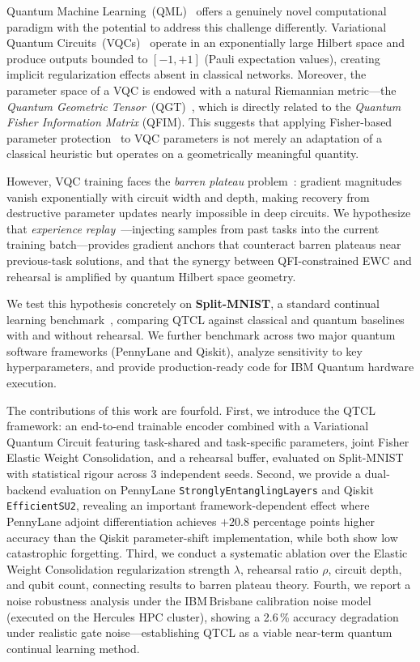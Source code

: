 \documentclass[a4paper,nopdfoutputerror]{quantumarticle}
\begin{document}
Quantum Machine Learning~(QML)~\cite{biamonte2017,schuld2019} offers a
genuinely novel computational paradigm with the potential to address this
challenge differently.
Variational Quantum Circuits~(VQCs)~\cite{cerezo2021variational} operate in
an exponentially large Hilbert space and produce outputs bounded to $[-1,+1]$
(Pauli expectation values), creating implicit regularization effects absent in
classical networks.
Moreover, the parameter space of a VQC is endowed with a natural Riemannian
metric---the \emph{Quantum Geometric Tensor}~(QGT)~\cite{haug2021}, which is
directly related to the \emph{Quantum Fisher Information Matrix} (QFIM).
This suggests that applying Fisher-based parameter protection~\cite{kirkpatrick2017overcoming}
to VQC parameters is not merely an adaptation of a classical heuristic but
operates on a geometrically meaningful quantity.

However, VQC training faces the \emph{barren plateau}
problem~\cite{mcclean2018barren}: gradient magnitudes vanish exponentially
with circuit width and depth, making recovery from destructive parameter
updates nearly impossible in deep circuits.
We hypothesize that \emph{experience replay}~\cite{Rebuffi2017}---injecting
samples from past tasks into the current training batch---provides gradient
anchors that counteract barren plateaus near previous-task solutions, and
that the synergy between QFI-constrained EWC and rehearsal is amplified by
quantum Hilbert space geometry.

We test this hypothesis concretely on \textbf{Split-MNIST}, a standard continual
learning benchmark~\cite{zenke2017continual,lecun1998}, comparing
QTCL against classical and quantum baselines with and without rehearsal.
We further benchmark across two major quantum software frameworks (PennyLane
and Qiskit), analyze sensitivity to key hyperparameters, and provide
production-ready code for IBM Quantum hardware execution.

The contributions of this work are fourfold.
First, we introduce the QTCL framework: an end-to-end trainable encoder combined
with a Variational Quantum Circuit featuring task-shared and task-specific
parameters, joint Fisher Elastic Weight Consolidation, and a rehearsal buffer,
evaluated on Split-MNIST with statistical rigour across 3 independent seeds.
Second, we provide a dual-backend evaluation on PennyLane
\texttt{StronglyEntanglingLayers} and Qiskit \texttt{EfficientSU2}, revealing
an important framework-dependent effect where PennyLane adjoint differentiation
achieves $+20.8$ percentage points higher accuracy than the Qiskit
parameter-shift implementation, while both show low catastrophic forgetting.
Third, we conduct a systematic ablation over the Elastic Weight Consolidation
regularization strength $\lambda$, rehearsal ratio $\rho$, circuit depth, and
qubit count, connecting results to barren plateau theory.
Fourth, we report a noise robustness analysis under the IBM\,Brisbane calibration
noise model (executed on the Hercules HPC cluster), showing a 2.6\,\% accuracy
degradation under realistic gate noise---establishing QTCL as a viable
near-term quantum continual learning method.
\end{document}
